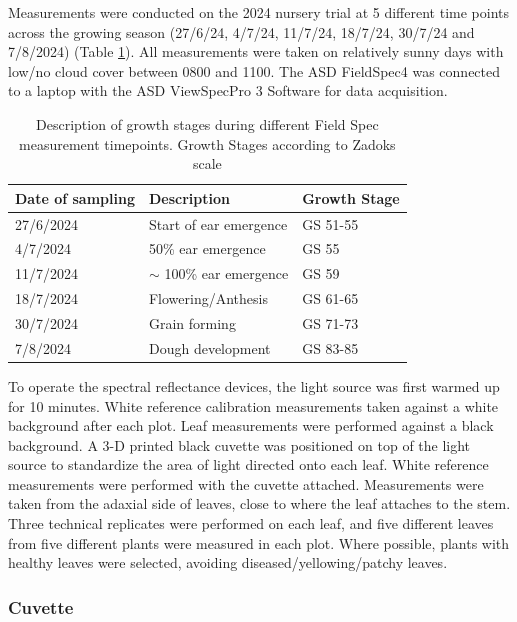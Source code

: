 \documentclass{article}
\begin{document}
Measurements were conducted on the 2024 nursery trial at 5 different time points
across the growing season (27/6/24, 4/7/24, 11/7/24, 18/7/24, 30/7/24 and 7/8/2024)
(Table \ref{sampling_table}). All measurements were taken on relatively
sunny days with low/no cloud cover between 0800 and 1100. The ASD FieldSpec4
was connected to a laptop with the ASD ViewSpecPro 3 Software for data
acquisition.

\begin{table}[ht]
	\centering
	\begin{tabular}{@{}lll@{}}
		\toprule Date of sampling & Description                & Growth Stage \\
		\midrule 27/6/2024        & Start of ear emergence     & GS 51-55     \\
		4/7/2024                  & 50\% ear emergence         & GS 55        \\
		11/7/2024                 & $\sim$ 100\% ear emergence & GS 59        \\
		18/7/2024                 & Flowering/Anthesis         & GS 61-65     \\
		30/7/2024                 & Grain forming              & GS 71-73     \\
		7/8/2024                  & Dough development          & GS 83-85     \\
		\bottomrule
	\end{tabular}
	\caption{Description of growth stages during different Field Spec
		measurement timepoints. Growth Stages according to Zadoks scale}
	\label{sampling_table}
\end{table}

To operate the spectral reflectance devices, the light source was first warmed up for 10 minutes. White reference calibration measurements taken against a white background after each plot. Leaf measurements were performed against a black background. A 3-D printed black cuvette was positioned on top of the light source to standardize the area of light directed onto each leaf. White reference measurements were performed with the cuvette attached. Measurements were taken from the adaxial side of leaves, close to where the leaf attaches to the stem. Three technical replicates were performed on each leaf, and five different leaves from five different plants were measured in each plot. Where possible, plants with healthy leaves were selected, avoiding diseased/yellowing/patchy leaves.

\subsubsection{Cuvette}
\end{document}
